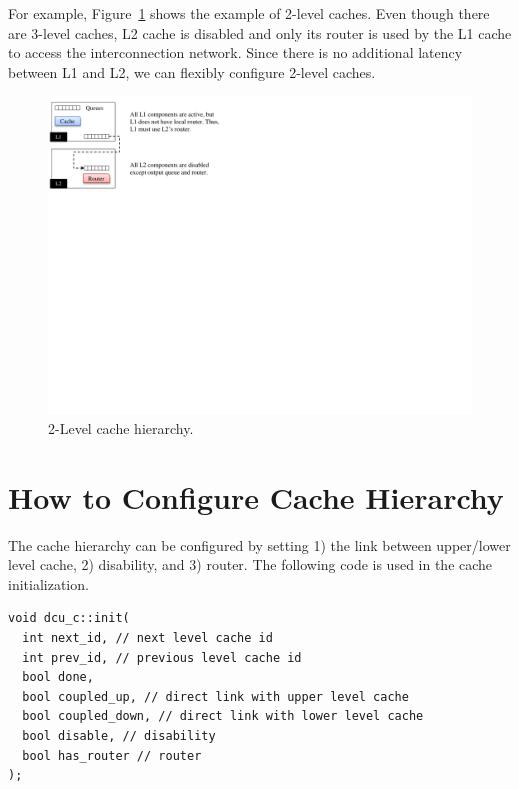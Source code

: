 For example, Figure~\ref{fig:level2cache} shows the example of 2-level
caches. Even though there are 3-level caches, L2 cache is disabled and
only its router is used by the L1 cache to access the interconnection
network. Since there is no additional latency between L1 and L2, we
can flexibly configure 2-level caches.


\begin{figure}[htb]
\centering
\includegraphics{figs/level2cache}
\caption{2-Level cache hierarchy.}
\label{fig:level2cache}
\end{figure}


\section{How to Configure Cache Hierarchy} 

The cache hierarchy can be configured by setting 1) the link between
upper/lower level cache, 2) disability, and 3) router. The following
code is used in the \SIM cache initialization.

\begin{Verbatim}
void dcu_c::init(
  int next_id, // next level cache id
  int prev_id, // previous level cache id
  bool done, 
  bool coupled_up, // direct link with upper level cache
  bool coupled_down, // direct link with lower level cache
  bool disable, // disability
  bool has_router // router
);
\end{Verbatim}

